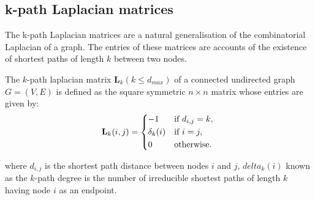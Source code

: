 \documentclass[10pt,a4paper]{article}
\begin{document}
    
    	\subsection{ k-path Laplacian matrices}
    	
    	The k-path Laplacian matrices are a natural generalisation of the combinatorial Laplacian of a graph. The entries of these matrices are accounts of the existence of shortest paths of length $k$ between two nodes.
    	
    	The $k$-path laplacian matrix $\mathbf{L}_{k} (k \leq d_{max})$ of a connected undirected graph $G=(V,E)$ is defined as the square symmetric $n\times n$ matrix whose entries are given by:
    	\begin{equation}
    	\mathbf{L}_k(i,j) =  \begin{cases*}
    	-1 & if  $d_{i,j} = k,$  \\
    	\delta_{k}(i) & if $i = j,$ \\
    	0 & otherwise.
    	\end{cases*}
    	\label{kpathlap}
    	\end{equation}
    	
    	where $d_{i,j}$ is the shortest path distance between nodes $i$ and $j$, $delta_{k}(i)$ known as the $k$-path degree is the number of irreducible shortest paths of length $k$ having node $i$ as an endpoint.
    	
\end{document}
